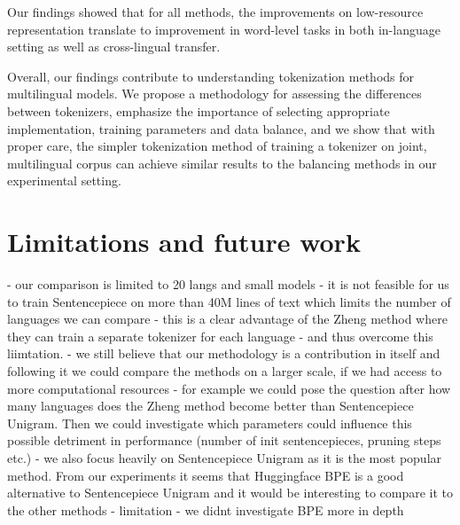 Our findings showed that for all methods, the improvements on low-resource representation translate to improvement in word-level tasks in both in-language setting as well as cross-lingual transfer. 

Overall, our findings contribute to understanding tokenization methods for multilingual models. We propose a methodology for assessing the differences between tokenizers, emphasize the importance of selecting appropriate implementation, training parameters and data balance, and we show that with proper care, the simpler tokenization method of training a tokenizer on joint, multilingual corpus can achieve similar results to the balancing methods in our experimental setting.

\section{Limitations and future work}



- our comparison is limited to 20 langs and small models
    - it is not feasible for us to train Sentencepiece on more than 40M lines of text which limits the number of languages we can compare
    - this is a clear advantage of the Zheng method where they can train a separate tokenizer for each language - and thus overcome this liimtation.
    - we still believe that our methodology is a contribution in itself and following it we could compare the methods on a larger scale, if we had access to more computational resources
        - for example we could pose the question after how many languages does the Zheng method become better than Sentencepiece Unigram. Then we could investigate which parameters could influence this possible detriment in performance (number of init sentencepieces, pruning steps etc.)
- we also focus heavily on Sentencepiece Unigram as it is the most popular method. From our experiments it seems that Huggingface BPE is a good alternative to Sentencepiece Unigram and it would be interesting to compare it to the other methods
- limitation - we didnt investigate BPE more in depth
